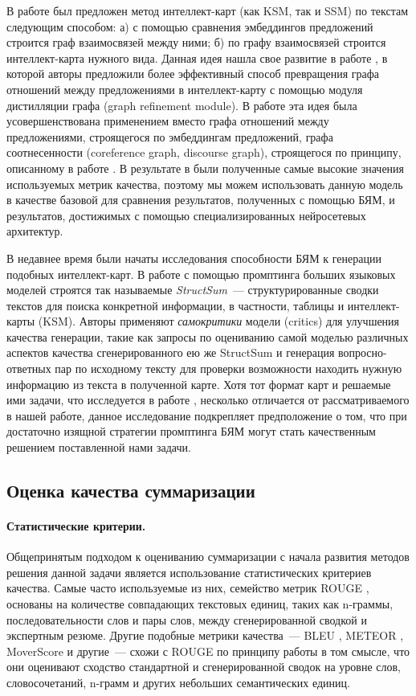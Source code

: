 \documentclass[12pt]{article}
\begin{document}
В работе \cite{wei2019revealing} был предложен метод интеллект-карт (как KSM, так и SSM) по текстам следующим способом: а) с помощью сравнения эмбеддингов предложений строится граф взаимосвязей между ними; б) по графу взаимосвязей строится интеллект-карта нужного вида. Данная идея нашла свое развитие в работе \cite{hu2021efficient}, в которой авторы предложили более эффективный способ превращения графа отношений между предложениями в интеллект-карту с помощью модуля дистилляции графа (graph refinement module). В работе \cite{zhang2024coreference} эта идея была усовершенствована применением вместо графа отношений между предложениями, строящегося по эмбеддингам предложений, графа соотнесенности (coreference graph, discourse graph), строящегося по принципу, описанному в работе \cite{xu2019discourse}. В результате в \cite{zhang2024coreference} были полученные самые высокие значения используемых метрик качества, поэтому мы можем использовать данную модель в качестве базовой для сравнения результатов, полученных с помощью БЯМ, и результатов, достижимых с помощью специализированных нейросетевых архитектур.

В недавнее время были начаты исследования способности БЯМ к генерации подобных интеллект-карт. В работе \cite{jain2024structsum} с помощью промптинга больших языковых моделей строятся так называемые \emph{StructSum}~--- структурированные сводки текстов для поиска конкретной информации, в частности, таблицы и интеллект-карты (KSM). Авторы применяют \textit{самокритики} модели (critics) для улучшения качества генерации, такие как запросы по оцениванию самой моделью различных аспектов качества сгенерированного ею же StructSum и генерация вопросно-ответных пар по исходному тексту для проверки возможности находить нужную информацию из текста в полученной карте. Хотя тот формат карт и решаемые ими задачи, что исследуется в работе \cite{jain2024structsum}, несколько отличается от рассматриваемого в нашей работе, данное исследование подкрепляет предположение о том, что при достаточно изящной стратегии промптинга БЯМ могут стать качественным решением поставленной нами задачи.

\subsection{Оценка качества суммаризации}
\paragraph{Статистические критерии.} Общепринятым подходом к оцениванию суммаризации с начала развития методов решения данной задачи является использование статистических критериев качества. Самые часто используемые из них, семейство метрик ROUGE \cite{lin2004rouge}, основаны на количестве совпадающих текстовых единиц, таких как n-граммы, последовательности слов и пары слов, между сгенерированной сводкой и экспертным резюме. Другие подобные метрики качества~--- BLEU \cite{papineni2002bleu}, METEOR \cite{banerjee2005meteor}, MoverScore \cite{zhao2019moverscore} и другие~--- схожи с ROUGE по принципу работы в том смысле, что они оценивают сходство стандартной и сгенерированной сводок на уровне слов, словосочетаний, n-грамм и других небольших семантических единиц. 
\end{document}
